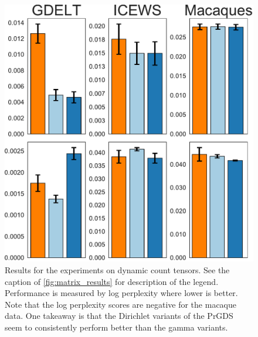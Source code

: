 \documentclass{article}
\begin{document}
\begin{figure}[h]
\centering
\includegraphics[width=0.75\linewidth]{../../results/tensors/new_tensor_results.pdf}
\caption{\footnotesize\label{fig:tensor_results} Results for the experiments on dynamic count tensors. See the caption of \cref{fig:matrix_results} for description of the legend. Performance is measured by log perplexity where lower is better. Note that the log perplexity scores are negative for the macaque data. One takeaway is that the Dirichlet variants of the PrGDS seem to consistently perform better than the gamma variants.~}
\end{figure}








\end{document}

